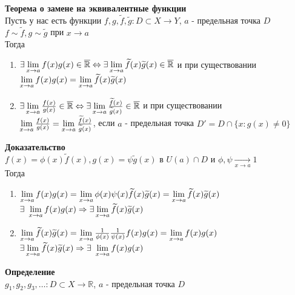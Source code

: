 \documentclass[12pt]{article}
\begin{document}
\textbf{Теорема о замене на эквивалентные функции}\\
Пусть у нас есть функции $f,g,\widetilde{f}, \widetilde{g}: D \subset X \rightarrow Y$, $a$ - предельная точка $D$\\
$f \sim \widetilde{f}, g \sim \widetilde{g}$ при $x \rightarrow a$\\
Тогда
\begin{enumerate}
    \item $\exists\lim\limits_{x\rightarrow a} f(x)g(x) \in \overline{\mathbb{R}} \Leftrightarrow \exists\lim\limits_{x\rightarrow a} \widetilde{f}(x)\widetilde{g}(x) \in \overline{\mathbb{R}}$ и при существовании\\
    $\lim\limits_{x\rightarrow a} f(x)g(x) = \lim\limits_{x\rightarrow a} \widetilde{f}(x)\widetilde{g}(x)$
    \item $\exists\lim\limits_{x\rightarrow a} \frac{f(x)}{g(x)} \in \overline{\mathbb{R}} \Leftrightarrow \exists\lim\limits_{x\rightarrow a} \frac{\widetilde{f}(x)}{\widetilde{g}(x)} \in \overline{\mathbb{R}}$ и при существовании\\
    $\lim\limits_{x\rightarrow a} \frac{f(x)}{g(x)} = \lim\limits_{x\rightarrow a} \frac{\widetilde{f}(x)}{\widetilde{g}(x)}$, если $a$ - предельная точка $D'=D\cap \{x: g(x) \neq 0\}$
\end{enumerate}
\textbf{Доказательство}\\
$f(x) = \phi(x)\widetilde{f}(x), g(x) = \psi\widetilde{g}(x)$ в $U(a) \cap D$ и $\phi, \psi \xrightarrow[x\rightarrow a]{} 1$\\
Тогда
\begin{enumerate}
    \item $\lim\limits_{x\rightarrow a} f(x)g(x) = \lim\limits_{x\rightarrow a} \phi(x)\psi(x)\widetilde{f}(x)\widetilde{g}(x) = \lim\limits_{x\rightarrow a} \widetilde{f}(x)\widetilde{g}(x)$\\
    $\exists\ \lim\limits_{x\rightarrow a} f(x)g(x) \Rightarrow \exists\lim\limits_{x\rightarrow a} \widetilde{f}(x)\widetilde{g}(x)$
    \item $\lim\limits_{x\rightarrow a} \widetilde{f}(x)\widetilde{g}(x) = \lim\limits_{x\rightarrow a} \frac1{\phi(x)}\frac1{\psi(x)}f(x)g(x) = \lim\limits_{x\rightarrow a} f(x)g(x)$\\
    $\exists\liml_{x\rightarrow a} \widetilde{f}(x)\widetilde{g}(x) \Rightarrow \exists\ \liml_{x\rightarrow a} f(x)g(x)$
\end{enumerate}
\textbf{Определение}\\
$g_1,g_2,g_3,\ldots: D\subset X\rightarrow \mathbb{R}$, $a$ - предельная точка $D$\\
\end{document}
